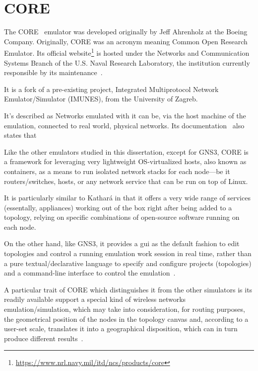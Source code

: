 \section{CORE}
\label{sec:exemulcore}

The CORE~\cite{coreemulator} emulator was developed originally by Jeff Ahrenholz at the Boeing Company.
Originally, CORE was an acronym meaning Common Open Research Emulator.
Its official website\footnote{\url{https://www.nrl.navy.mil/itd/ncs/products/core}} is hosted under the Networks and Communication Systems Branch of the U.S. Naval Research Laboratory, the institution currently responsible by its maintenance~\cite{Peach2016AnOO}.

It is a fork of a pre-existing project, Integrated Multiprotocol Network Emulator/Simulator (IMUNES), from the University of Zagreb.

It's described as 
Networks emulated with it can be, via the host machine of the emulation, connected to real world, physical networks.
Its documentation~\cite{coreghdocs} also states that 

Like the other emulators studied in this dissertation, except for GNS3, CORE is a framework for leveraging very lightweight OS-virtualized hosts, also known as containers, as a means to run isolated network stacks for each node---be it routers/switches, hosts, or any network service that can be run on top of Linux.

It is particularly similar to Kathará in that it offers a very wide range of services (essentally, appliances) working out of the box right after being added to a topology, relying on specific combinations of open-source software running on each node.

On the other hand, like GNS3, it provides a \gls{gui} as the default fashion to edit topologies and control a running emulation work session in real time, rather than a pure textual/declarative language to specify and configure projects (topologies) and a command-line interface to control the emulation~\cite{coreghdocs}.

A particular trait of CORE which distinguishes it from the other simulators is its readily available support a special kind of wireless networks emulation/simulation, which may take into consideration, for routing purposes, the geometrical position of the nodes in the topology canvas and, according to a user-set scale, translates it into a geographical disposition, which can in turn produce different results~\cite{ospfmanet}.

